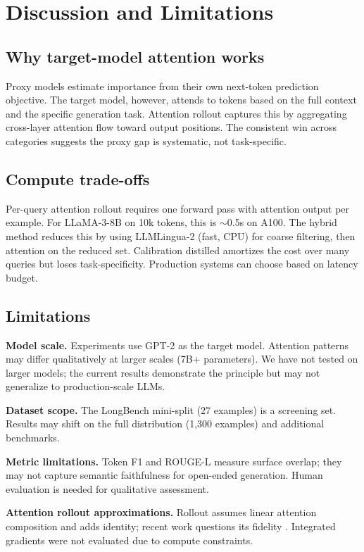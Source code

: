 \documentclass[11pt,letterpaper]{article}
\begin{document}
\section{Discussion and Limitations}

\subsection{Why target-model attention works}
Proxy models estimate importance from their own next-token prediction objective. The target model, however, attends to tokens based on the full context and the specific generation task. Attention rollout captures this by aggregating cross-layer attention flow toward output positions. The consistent win across categories suggests the proxy gap is systematic, not task-specific.

\subsection{Compute trade-offs}
Per-query attention rollout requires one forward pass with attention output per example. For LLaMA-3-8B on 10k tokens, this is $\sim$0.5s on A100. The hybrid method reduces this by using LLMLingua-2 (fast, CPU) for coarse filtering, then attention on the reduced set. Calibration distilled amortizes the cost over many queries but loses task-specificity. Production systems can choose based on latency budget.

\subsection{Limitations}
\textbf{Model scale.} Experiments use GPT-2 as the target model. Attention patterns may differ qualitatively at larger scales (7B+ parameters). We have not tested on larger models; the current results demonstrate the principle but may not generalize to production-scale LLMs.

\textbf{Dataset scope.} The LongBench mini-split (27 examples) is a screening set. Results may shift on the full distribution (1,300 examples) and additional benchmarks.

\textbf{Metric limitations.} Token F1 and ROUGE-L measure surface overlap; they may not capture semantic faithfulness for open-ended generation. Human evaluation is needed for qualitative assessment.

\textbf{Attention rollout approximations.} Rollout assumes linear attention composition and adds identity; recent work questions its fidelity \citep{Jain2019}. Integrated gradients were not evaluated due to compute constraints.
\end{document}
